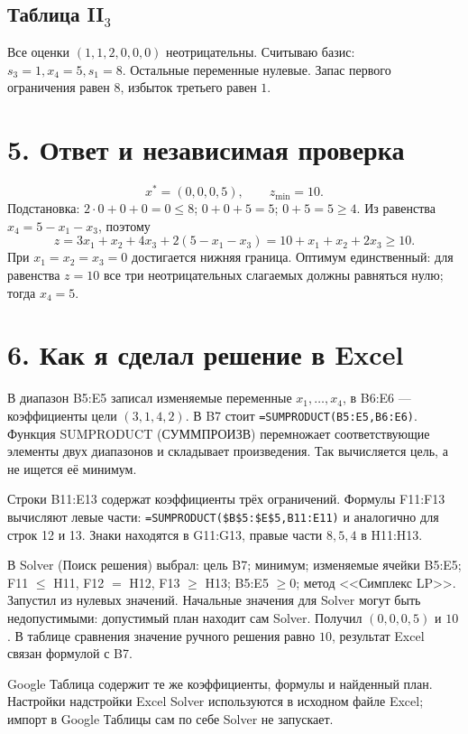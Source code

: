 \documentclass[12pt,a4paper]{article}
\begin{document}
\subsection*{Таблица II$_{3}$}
Все оценки $(1,1,2,0,0,0)$ неотрицательны. Считываю базис: $s_3=1,x_4=5,s_1=8$. Остальные переменные нулевые. Запас первого ограничения равен $8$, избыток третьего равен $1$.

\section*{5. Ответ и независимая проверка}
\[
x^*=(0,0,0,5),\qquad z_{\min}=10.
\]
Подстановка: $2\cdot0+0+0=0\le8$; $0+0+5=5$; $0+5=5\ge4$.
Из равенства $x_4=5-x_1-x_3$, поэтому
\[
z=3x_1+x_2+4x_3+2(5-x_1-x_3)
=10+x_1+x_2+2x_3\ge10.
\]
При $x_1=x_2=x_3=0$ достигается нижняя граница.
Оптимум единственный: для равенства $z=10$ все три неотрицательных
слагаемых должны равняться нулю; тогда $x_4=5$.

\section*{6. Как я сделал решение в Excel}
В диапазон B5:E5 записал изменяемые переменные $x_1,\ldots,x_4$,
в B6:E6 --- коэффициенты цели $(3,1,4,2)$.
В B7 стоит \texttt{=SUMPRODUCT(B5:E5,B6:E6)}.
Функция SUMPRODUCT (СУММПРОИЗВ) перемножает соответствующие элементы
двух диапазонов и складывает произведения.
Так вычисляется цель, а не ищется её минимум.

Строки B11:E13 содержат коэффициенты трёх ограничений.
Формулы F11:F13 вычисляют левые части:
\texttt{=SUMPRODUCT(\$B\$5:\$E\$5,B11:E11)} и аналогично для строк 12 и 13.
Знаки находятся в G11:G13, правые части $8,5,4$ в H11:H13.

В Solver (Поиск решения) выбрал:
цель B7; минимум; изменяемые ячейки B5:E5;
F11 $\le$ H11, F12 $=$ H12, F13 $\ge$ H13;
B5:E5 $\ge0$; метод <<Симплекс LP>>.
Запустил из нулевых значений. Начальные значения для Solver
могут быть недопустимыми: допустимый план находит сам Solver.
Получил $(0,0,0,5)$ и $10$.
В таблице сравнения значение ручного решения равно $10$,
результат Excel связан формулой с B7.

Google Таблица содержит те же коэффициенты, формулы и найденный план.
Настройки надстройки Excel Solver используются в исходном файле Excel;
импорт в Google Таблицы сам по себе Solver не запускает.
\end{document}
